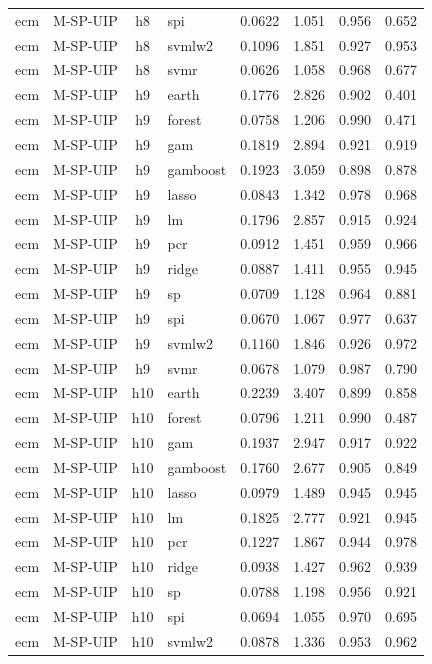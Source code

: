 \begin{ThreePartTable}
\begin{longtable}[t]{llclcccc}
ecm & M-SP-UIP & h8 & spi & 0.0622 & 1.051 & 0.956 & 0.652\\
ecm & M-SP-UIP & h8 & svmlw2 & 0.1096 & 1.851 & 0.927 & 0.953\\
ecm & M-SP-UIP & h8 & svmr & 0.0626 & 1.058 & 0.968 & 0.677\\
\addlinespace
ecm & M-SP-UIP & h9 & earth & 0.1776 & 2.826 & 0.902 & 0.401\\
ecm & M-SP-UIP & h9 & forest & 0.0758 & 1.206 & 0.990 & 0.471\\
ecm & M-SP-UIP & h9 & gam & 0.1819 & 2.894 & 0.921 & 0.919\\
ecm & M-SP-UIP & h9 & gamboost & 0.1923 & 3.059 & 0.898 & 0.878\\
ecm & M-SP-UIP & h9 & lasso & 0.0843 & 1.342 & 0.978 & 0.968\\
ecm & M-SP-UIP & h9 & lm & 0.1796 & 2.857 & 0.915 & 0.924\\
ecm & M-SP-UIP & h9 & pcr & 0.0912 & 1.451 & 0.959 & 0.966\\
ecm & M-SP-UIP & h9 & ridge & 0.0887 & 1.411 & 0.955 & 0.945\\
ecm & M-SP-UIP & h9 & sp & 0.0709 & 1.128 & 0.964 & 0.881\\
ecm & M-SP-UIP & h9 & spi & 0.0670 & 1.067 & 0.977 & 0.637\\
ecm & M-SP-UIP & h9 & svmlw2 & 0.1160 & 1.846 & 0.926 & 0.972\\
ecm & M-SP-UIP & h9 & svmr & 0.0678 & 1.079 & 0.987 & 0.790\\
\addlinespace
ecm & M-SP-UIP & h10 & earth & 0.2239 & 3.407 & 0.899 & 0.858\\
ecm & M-SP-UIP & h10 & forest & 0.0796 & 1.211 & 0.990 & 0.487\\
ecm & M-SP-UIP & h10 & gam & 0.1937 & 2.947 & 0.917 & 0.922\\
ecm & M-SP-UIP & h10 & gamboost & 0.1760 & 2.677 & 0.905 & 0.849\\
ecm & M-SP-UIP & h10 & lasso & 0.0979 & 1.489 & 0.945 & 0.945\\
ecm & M-SP-UIP & h10 & lm & 0.1825 & 2.777 & 0.921 & 0.945\\
ecm & M-SP-UIP & h10 & pcr & 0.1227 & 1.867 & 0.944 & 0.978\\
ecm & M-SP-UIP & h10 & ridge & 0.0938 & 1.427 & 0.962 & 0.939\\
ecm & M-SP-UIP & h10 & sp & 0.0788 & 1.198 & 0.956 & 0.921\\
ecm & M-SP-UIP & h10 & spi & 0.0694 & 1.055 & 0.970 & 0.695\\
ecm & M-SP-UIP & h10 & svmlw2 & 0.0878 & 1.336 & 0.953 & 0.962\\

\end{longtable}
\end{ThreePartTable}

